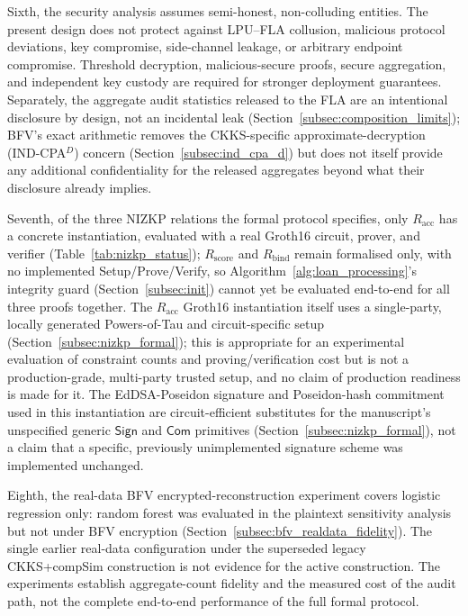 \documentclass[a4paper,fleqn]{cas-dc}
\begin{document}
Sixth, the security analysis assumes semi-honest, non-colluding entities. The present design does not protect against LPU--FLA collusion, malicious protocol deviations, key compromise, side-channel leakage, or arbitrary endpoint compromise. Threshold decryption, malicious-secure proofs, secure aggregation, and independent key custody are required for stronger deployment guarantees. Separately, the aggregate audit statistics released to the FLA are an intentional disclosure by design, not an incidental leak (Section~\ref{subsec:composition_limits}); BFV's exact arithmetic removes the CKKS-specific approximate-decryption (IND-CPA$^D$) concern (Section~\ref{subsec:ind_cpa_d}) but does not itself provide any additional confidentiality for the released aggregates beyond what their disclosure already implies.

Seventh, of the three NIZKP relations the formal protocol specifies, only $R_{\mathrm{acc}}$ has a concrete instantiation, evaluated with a real Groth16 circuit, prover, and verifier (Table~\ref{tab:nizkp_status}); $R_{\mathrm{score}}$ and $R_{\mathrm{bind}}$ remain formalised only, with no implemented \textsf{Setup}/\textsf{Prove}/\textsf{Verify}, so Algorithm~\ref{alg:loan_processing}'s integrity guard (Section~\ref{subsec:init}) cannot yet be evaluated end-to-end for all three proofs together. The $R_{\mathrm{acc}}$ Groth16 instantiation itself uses a single-party, locally generated Powers-of-Tau and circuit-specific setup (Section~\ref{subsec:nizkp_formal}); this is appropriate for an experimental evaluation of constraint counts and proving/verification cost but is not a production-grade, multi-party trusted setup, and no claim of production readiness is made for it. The EdDSA-Poseidon signature and Poseidon-hash commitment used in this instantiation are circuit-efficient substitutes for the manuscript's unspecified generic $\mathsf{Sign}$ and $\mathsf{Com}$ primitives (Section~\ref{subsec:nizkp_formal}), not a claim that a specific, previously unimplemented signature scheme was implemented unchanged.

Eighth, the real-data BFV encrypted-reconstruction experiment covers logistic regression only: random forest was evaluated in the plaintext sensitivity analysis but not under BFV encryption (Section~\ref{subsec:bfv_realdata_fidelity}). The single earlier real-data configuration under the superseded legacy CKKS+compSim construction is not evidence for the active construction. The experiments establish aggregate-count fidelity and the measured cost of the audit path, not the complete end-to-end performance of the full formal protocol.
\end{document}
